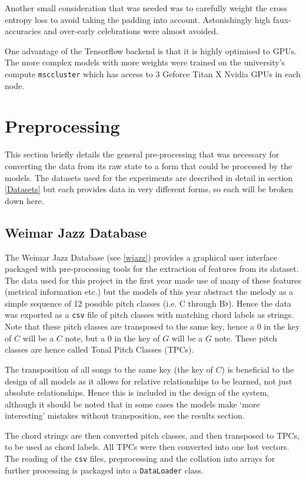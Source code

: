 \documentclass[bsc,singlespacing,logo, parskip, deptreport]{infthesis}
\begin{document}
Another small consideration that was needed was to carefully weight the cross entropy loss to avoid taking the padding into account. Astonishingly high faux-accuracies and over-early celebrations were almost avoided.

One advantage of the Tensorflow backend is that it is highly optimised to GPUs. The more complex models with more weights were trained on the university's compute {\tt msccluster} which has access to 3 Geforce Titan X Nvidia GPUs in each node.

\section{Preprocessing} \label{preprocessing}

This section briefly details the general pre-processing that was necessary for converting the data from its raw state to a form that could be processed by the models. The datasets used for the experiments are described in detail in section \ref{Datasets} but each provides data in very different forms, so each will be broken down here.

\subsection{Weimar Jazz Database}

The Weimar Jazz Database (see \ref{wjazz}) provides a graphical user interface packaged with pre-processing tools for the extraction of features from its dataset. The data used for this project in the first year made use of many of these features (metrical information etc.) but the models of this year abstract the melody as a simple sequence of 12 possible pitch classes (i.e. C through B$\flat$). Hence the data was exported as a {\tt csv} file of pitch classes with matching chord labels as strings. Note that these pitch classes are transposed to the same key, hence a 0 in the key of $C$ will be a $C$ note, but a 0 in the key of $G$ will be a $G$ note. These pitch classes are hence called Tonal Pitch Classes (TPCs).

The transposition of all songs to the same key (the key of $C$) is beneficial to the design of all models as it allows for relative relationships to be learned, not just absolute relationships. Hence this is included in the design of the system, although it should be noted that in some cases the models make `more interesting' mistakes without transposition, see the results section.

The chord strings are then converted pitch classes, and then transposed to TPCs, to be used as chord labels. All TPCs were then converted into one hot vectors. The reading of the {\tt csv} files, preprocessing and the collation into arrays for further processing is packaged into a {\tt DataLoader} class.
\end{document}
